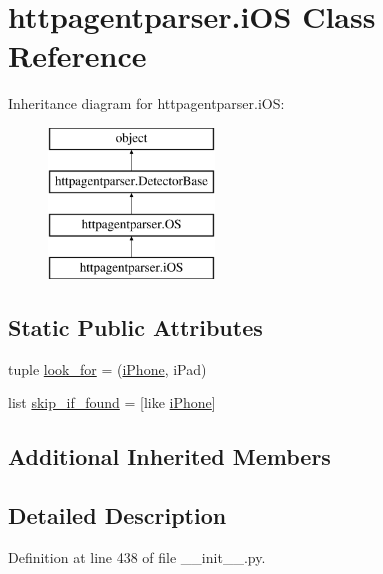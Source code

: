 \hypertarget{classhttpagentparser_1_1i_o_s}{}\section{httpagentparser.\+i\+OS Class Reference}
\label{classhttpagentparser_1_1i_o_s}
Inheritance diagram for httpagentparser.\+i\+OS\+:\begin{figure}[H]
\begin{center}
\leavevmode
\includegraphics[height=4.000000cm]{classhttpagentparser_1_1i_o_s}
\end{center}
\end{figure}
\subsection*{Static Public Attributes}
\begin{DoxyCompactItemize}
\item 
tuple \hyperlink{classhttpagentparser_1_1i_o_s_af7f9a185ba4791b5046ffe710224a8e3}{look\+\_\+for} = (\textquotesingle{}\hyperlink{classhttpagentparser_1_1i_phone}{i\+Phone}\textquotesingle{}, \textquotesingle{}i\+Pad\textquotesingle{})
\item 
list \hyperlink{classhttpagentparser_1_1i_o_s_a3c7dba3ed9383a492aae82cd2c2f2e72}{skip\+\_\+if\+\_\+found} = \mbox{[}\textquotesingle{}like \hyperlink{classhttpagentparser_1_1i_phone}{i\+Phone}\textquotesingle{}\mbox{]}
\end{DoxyCompactItemize}
\subsection*{Additional Inherited Members}


\subsection{Detailed Description}


Definition at line 438 of file \+\_\+\+\_\+init\+\_\+\+\_\+.\+py.



